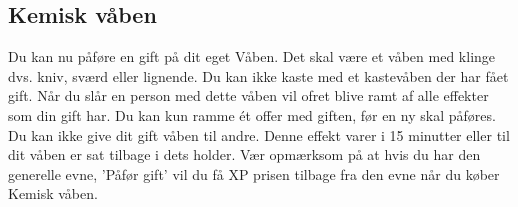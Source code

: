 \subsection{Kemisk våben}
Du kan nu påføre en gift på dit eget Våben. Det skal være et våben med klinge dvs. kniv, sværd eller lignende. Du kan ikke kaste med et kastevåben der har fået gift. Når du slår en person med dette våben vil ofret blive ramt af alle effekter som din gift har. Du kan kun ramme ét offer med giften, før en ny skal påføres. Du kan ikke give dit gift våben til andre. Denne effekt varer i 15 minutter eller til dit våben er sat tilbage i dets holder. Vær opmærksom på at hvis du har den generelle evne, 'Påfør gift' vil du få XP prisen tilbage fra den evne når du køber Kemisk våben.\\